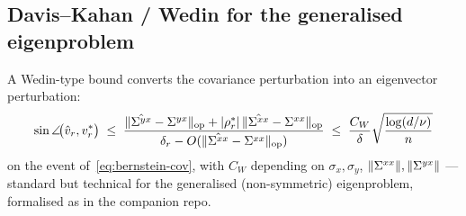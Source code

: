 \subsection{Davis--Kahan / Wedin for the generalised eigenproblem}
\label{ssec:davis-kahan}

A Wedin-type bound converts the covariance perturbation into an eigenvector
perturbation:
\begin{equation}
\label{eq:wedin}
\sin\angle\!\big(\hat v_r, v_r^*\big)
\;\le\;
\frac{\|\hat{\Sigma^{yx}} - \Sigma^{yx}\|_{\mathrm{op}} + |\rho_r^*|\,\|\hat{\Sigma^{xx}} - \Sigma^{xx}\|_{\mathrm{op}}}
     {\delta_r - O(\|\hat{\Sigma^{xx}} - \Sigma^{xx}\|_{\mathrm{op}})}
\;\le\;
\frac{C_W}{\delta} \sqrt{\frac{\log(d/\nu)}{n}}
\end{equation}
on the event of~\eqref{eq:bernstein-cov}, with $C_W$ depending on
$\sigma_x, \sigma_y$, $\|\Sigma^{xx}\|, \|\Sigma^{yx}\|$ — standard but technical for the
generalised (non-symmetric) eigenproblem, formalised as
 in the companion repo.
